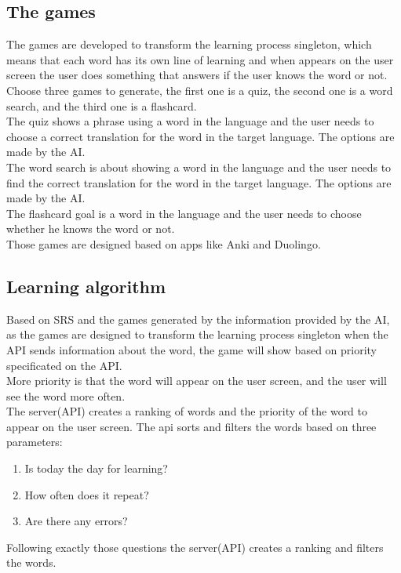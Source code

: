 \documentclass[12pt]{article}
\begin{document}
\subsection{The games}
  The games are developed to transform the learning process singleton, which means that each word has its own line of learning and when appears on the user screen the user does something that answers if the user knows the word or not. \\
  Choose three games to generate, the first one is a quiz, the second one is a word search, and the third one is a flashcard. \\
  The quiz shows a phrase using a word in the language and the user needs to choose a correct translation for the word in the target language. The options are made by the AI. \\
  The word search is about showing a word in the language and the user needs to find the correct translation for the word in the target language. The options are made by the AI. \\
  The flashcard goal is  a word in the language and the user needs to choose whether he knows the word or not. \\
  Those games are designed based on apps like Anki and Duolingo.
\subsection{Learning algorithm}
Based on SRS and the games generated by the information provided by the AI, as the games are designed to transform the learning process singleton when the API sends information about the word, the game will show based on priority specificated on the API. \\
More priority is that the word will appear on the user screen, and the user will see the word more often. \\
The server(API) creates a ranking of words and the priority of the word to appear on the user screen. The api sorts and filters the words based on three parameters: 
\begin{enumerate}
  \item Is today the day for learning?
  \item How often does it repeat? 
  \item Are there any errors?
\end{enumerate}
Following exactly those questions the server(API) creates a ranking and filters the words. 
\end{document}
